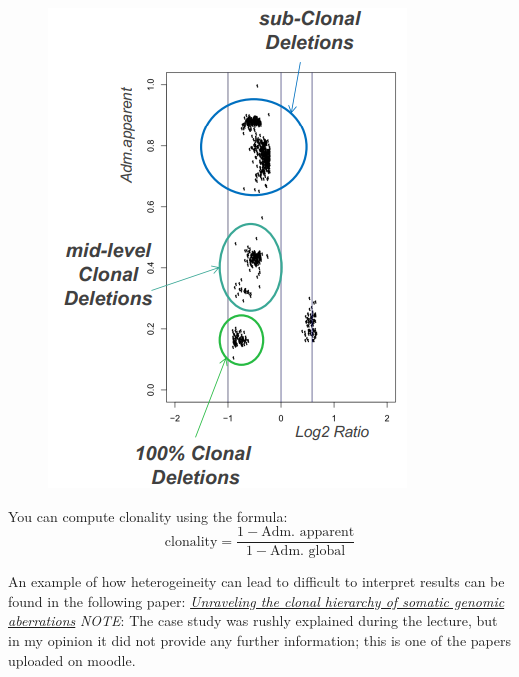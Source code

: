   \begin{figure}[H]
  \includegraphics{image_04.png}
  \end{figure}
  
  You can compute clonality using the formula:
  $$
  \text{clonality} = \frac{1 - \text{Adm. apparent}}{1 - \text{Adm. global}}
  $$

  An example of how heterogeineity can lead to difficult to interpret results can be found in the following paper:
  \href{https://pubmed.ncbi.nlm.nih.gov/25160065/}{\textit{Unraveling the clonal hierarchy of somatic genomic aberrations}}
  \textit{NOTE}: The case study was rushly explained during the lecture, but in my opinion it did not provide any further information; this is one of the papers uploaded on moodle.


